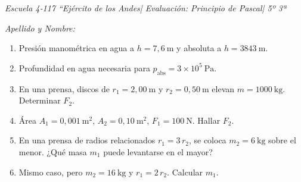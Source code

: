\documentclass[a4paper,12pt]{article}
\begin{document}
\textit{Escuela 4‑117 “Ejército de los Andes| Evaluación: Principio de Pascal| 5º 3ª}

\noindent\textit{Apellido y Nombre:} \underline{\hspace{12cm}}
\begin{enumerate}
  \item Presión manométrica en agua a $h=7{,}6\:\mathrm m$ y absoluta a $h=3843\:\mathrm m$.
  \item Profundidad en agua necesaria para $p_\text{abs}=3\times10^5\:\mathrm{Pa}$.
  \item En una prensa, discos de $r_1=2{,}00\:\mathrm m$ y $r_2=0{,}50\:\mathrm m$ elevan $m=1000\:\mathrm{kg}$. Determinar $F_2$.
  \item Área $A_1=0{,}001\:\mathrm{m^2}$, $A_2=0{,}10\:\mathrm{m^2}$, $F_1=100\:\mathrm N$. Hallar $F_2$.
  \item En una prensa de radios relacionados $r_1=3\,r_2$, se coloca $m_2=6\:\mathrm{kg}$ sobre el menor. ¿Qué masa $m_1$ puede levantarse en el mayor?
  \item Mismo caso, pero $m_2=16\:\mathrm{kg}$ y $r_1=2\,r_2$. Calcular $m_1$.
\end{enumerate}
\end{document}

